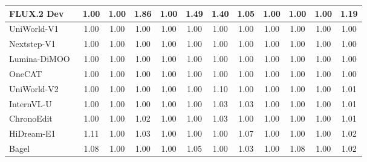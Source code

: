 \begin{table}[t]
{\begin{tabular}{l|cccccccccc|c}
            FLUX.2 Dev~\cite{flux-2-2025}
            & 1.00 & 1.00 & 1.86 & 1.00 & 1.49 & 1.40 & 1.05 & 1.00 & 1.00 & 1.00
            & \cellcolor[HTML]{C8C8C8}1.19 \\

            \midrule

            UniWorld-V1~\cite{lin2025uniworld}
            & 1.00 & 1.00 & 1.00 & 1.00 & 1.00 & 1.00 & 1.00 & 1.00 & 1.00 & 1.00
            & \cellcolor[HTML]{C8C8C8}1.00 \\

            Nextstep-V1~\cite{han2025nextstep}
            & 1.00 & 1.00 & 1.00 & 1.00 & 1.00 & 1.00 & 1.00 & 1.00 & 1.00 & 1.00
            & \cellcolor[HTML]{C8C8C8}1.00 \\

            Lumina-DiMOO~\cite{xin2025lumina}
            & 1.00 & 1.00 & 1.00 & 1.00 & 1.00 & 1.00 & 1.00 & 1.00 & 1.00 & 1.00
            & \cellcolor[HTML]{C8C8C8}1.00 \\

            OneCAT~\cite{li2025onecat}
            & 1.00 & 1.00 & 1.00 & 1.00 & 1.00 & 1.00 & 1.00 & 1.00 & 1.00 & 1.00
            & \cellcolor[HTML]{C8C8C8}1.00 \\


            UniWorld-V2~\cite{li2025uniworld}
            & 1.00 & 1.00 & 1.00 & 1.00 & 1.00 & 1.10 & 1.00 & 1.00 & 1.00 & 1.00
            & \cellcolor[HTML]{C8C8C8}1.01 \\

            InternVL-U~\cite{tian2026internvl}
            & 1.00 & 1.00 & 1.00 & 1.00 & 1.00 & 1.03 & 1.03 & 1.00 & 1.00 & 1.00
            & \cellcolor[HTML]{C8C8C8}1.01 \\

            ChronoEdit~\cite{wu2025chronoedit}
            & 1.00 & 1.00 & 1.02 & 1.00 & 1.00 & 1.03 & 1.00 & 1.00 & 1.00 & 1.00
            & \cellcolor[HTML]{C8C8C8}1.01 \\
        
            HiDream-E1~\cite{cai2025hidream}
            & 1.11 & 1.00 & 1.03 & 1.00 & 1.00 & 1.00 & 1.07 & 1.00 & 1.00 & 1.00
            & \cellcolor[HTML]{C8C8C8}1.02 \\

            Bagel~\cite{deng2025emerging}
            & 1.08 & 1.00 & 1.00 & 1.00 & 1.05 & 1.00 & 1.03 & 1.00 & 1.08 & 1.00
            & \cellcolor[HTML]{C8C8C8}1.02 \\


\end{tabular}}
\end{table}
